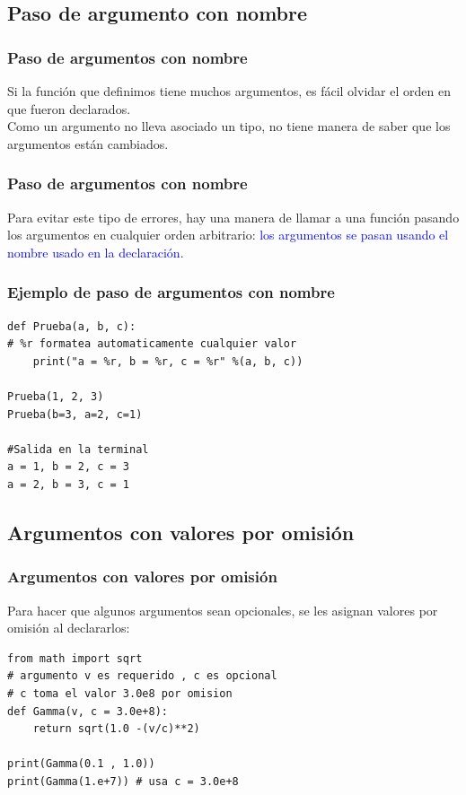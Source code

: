 \subsection{Paso de argumento con nombre}
\begin{frame}
\frametitle{Paso de argumentos con nombre}
Si la función que definimos tiene muchos argumentos, es fácil olvidar el orden en que fueron declarados.
\\
\medskip
Como un argumento no lleva asociado un tipo, \python{} no tiene manera de saber que los argumentos están cambiados.
\end{frame}
\begin{frame}
\frametitle{Paso de argumentos con nombre}
Para evitar este tipo de errores, hay una manera de llamar a una función pasando los argumentos en cualquier orden arbitrario: \textcolor{blue}{los argumentos se pasan usando el nombre usado en la declaración}.
\end{frame}
\begin{frame}[fragile]
\frametitle{Ejemplo de paso de argumentos con nombre}
\begin{lstlisting}[caption=Paso de argumentos con nombre,basicstyle=\linespread{1.2}\ttfamily\small, columns=fullflexible,escapeinside=||]
def Prueba(a, b, c):
# %r formatea automaticamente cualquier valor
    print("a = %r, b = %r, c = %r" %(a, b, c))

Prueba(1, 2, 3)
Prueba(b=3, a=2, c=1)

#Salida en la terminal
a = 1, b = 2, c = 3
a = 2, b = 3, c = 1
\end{lstlisting}
\end{frame}
\subsection{Argumentos con valores por omisión}
\begin{frame}[fragile]
\frametitle{Argumentos con valores por omisión}
Para hacer que algunos argumentos sean opcionales, se les asignan valores por omisión al declararlos:
\begin{lstlisting}[caption=Ejemplo cuando se omiten argumentos declarados, basicstyle=\linespread{1.2}\ttfamily\small, columns=fullflexible,escapeinside=||]
from math import sqrt
# argumento v es requerido , c es opcional
# c toma el valor 3.0e8 por omision
def Gamma(v, c = 3.0e+8):
    return sqrt(1.0 -(v/c)**2)

print(Gamma(0.1 , 1.0))
print(Gamma(1.e+7)) # usa c = 3.0e+8
\end{lstlisting}
\end{frame}
